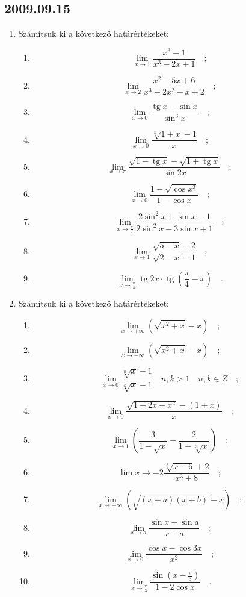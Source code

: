\documentclass{article}
\newenvironment{abc}{\begin{enumerate}[label=\textit{\alph*})]}{\end{enumerate}}
\newcommand{\tg}{\mathop{\mathrm{tg}}\nolimits}
\begin{document}
\subsection*{2009.09.15}
\begin{enumerate}
\item Számítsuk ki a következő határértékeket:
\begin{abc}
\item $$\lim_{x\to 1}\frac{x^3-1}{x^3-2x+1}\quad;$$
\item $$\lim_{x\to 2}\frac{x^2-5x+6}{x^3-2x^2-x+2}\quad;$$
\item $$\lim_{x\to 0}\frac{\tg x-\sin x}{\sin ^3 x}\quad;$$
\item $$\lim_{x\to 0}\frac{\sqrt[n]{1+x}-1}{x}\quad;$$
\item $$\lim_{x\to\pi}\frac{\sqrt{1-\tg x}-\sqrt{1+\tg x}}{\sin 2x}\quad;$$
\item $$\lim_{x\to 0}\frac{1-\sqrt{\cos x^3}}{1-\cos x}\quad;$$
\item $$\lim_{x\to\frac{\pi}{6}}\frac{2\sin ^2x+\sin x-1}{2\sin ^2x-3\sin x+1}\quad;$$
\item $$\lim_{x\to 1}\frac{\sqrt{5-x}-2}{\sqrt{2-x}-1}\quad;$$
\item $$\lim_{x\to\frac{\pi}{4}}\tg 2x\cdot\tg\left(\frac{\pi}{4}-x\right)\quad.$$
\end{abc}
\item Számítsuk ki a következő határértékeket:
\begin{abc}
\item $$\lim_{x\to +\infty}(\sqrt{x^2+x}-x)\quad;$$
\item $$\lim_{x\to -\infty}(\sqrt{x^2+x}-x)\quad;$$
\item $$\lim_{x\to 0}\frac{\sqrt[n]{x}-1}{\sqrt[k]{x}-1}\quad n,k>1\quad n,k\in{Z}\quad;$$
\item $$\lim_{x\to 0}\frac{\sqrt{1-2x-x^2}-(1+x)}{x}\quad;$$
\item $$\lim_{x\to 1}\left(\frac{3}{1-\sqrt{x}}-\frac{2}{1-\sqrt[3]{x}}\right)\quad;$$
\item $$\lim{x\to -2}\frac{\sqrt[3]{x-6}+2}{x^3+8}\quad;$$
\item $$\lim_{x\to +\infty}(\sqrt{(x+a)(x+b)}-x)\quad;$$
\item $$\lim_{x\to a}\frac{\sin x-\sin a}{x-a}\quad;$$
\item $$\lim_{x\to 0}\frac{\cos x-\cos 3x}{x^2}\quad;$$
\item $$\lim_{x\to\frac{\pi}{3}}\frac{\sin\left(x-\frac{\pi}{3}\right)}{1-2\cos x}\quad.$$
\end{abc}
\end{enumerate}
\end{document}
